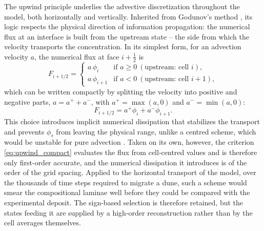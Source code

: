 \documentclass[lineno]{JFM-FLM_Au}
\begin{document}
The upwind principle underlies the advective discretization throughout the model, both horizontally and vertically. Inherited from Godunov's method \citep{Godunov1959}, its logic respects the physical direction of information propagation: the numerical flux at an interface is built from the upstream state -- the side from which the velocity transports the concentration. In its simplest form, for an advection velocity $a$, the numerical flux at face $i+\tfrac{1}{2}$ is
\begin{equation}
    F_{i+1/2} =
    \begin{cases}
        a\,\phi_i & \text{if } a \geq 0 \ (\text{upstream: cell } i), \\
        a\,\phi_{i+1} & \text{if } a < 0 \ (\text{upstream: cell } i+1),
    \end{cases}
    \label{eq:upwind_basic}
\end{equation}
which can be written compactly by splitting the velocity into positive and negative parts, $a = a^+ + a^-$, with $a^+=\max(a,0)$ and $a^-=\min(a,0)$:
\begin{equation}
    F_{i+1/2} = a^+ \phi_i + a^- \phi_{i+1}.
    \label{eq:upwind_compact}
\end{equation}
This choice introduces implicit numerical dissipation that stabilizes the transport and prevents $\phi_s$ from leaving the physical range, unlike a centred scheme, which would be unstable for pure advection \citep{Godunov1959}. Taken on its own, however, the criterion \eqref{eq:upwind_compact} evaluates the flux from cell-centred values and is therefore only first-order accurate, and the numerical dissipation it introduces is of the order of the grid spacing. Applied to the horizontal transport of the model, over the thousands of time steps required to migrate a dune, such a scheme would smear the compositional laminae well before they could be compared with the experimental deposit. The sign-based selection is therefore retained, but the states feeding it are supplied by a high-order reconstruction rather than by the cell averages themselves.
\end{document}
